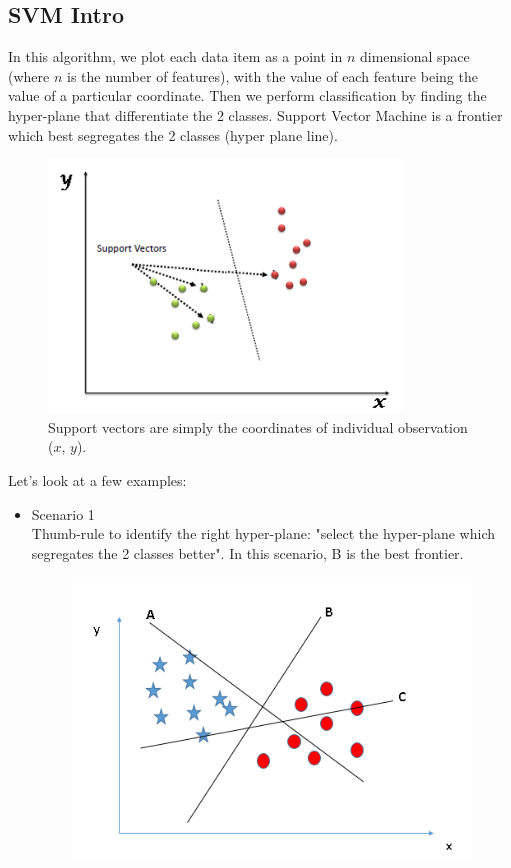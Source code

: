 \documentclass[a4paper,12pt]{report}
\begin{document}
\begin{appendices}
\section{SVM Intro}
In this algorithm, we plot each data item as a point in $n$ dimensional space (where $n$ is the number of features), with the value of each feature being the value of a particular coordinate. Then we perform classification by finding the hyper-plane that differentiate the 2 classes. Support Vector Machine is a frontier which best segregates the 2 classes (hyper plane line).
\begin{figure}[H]
	\centering
        \includegraphics[totalheight=4 cm]{SVM_1.png}\caption{Support vectors are simply the coordinates of individual observation ($x$, $y$).}
\end{figure}

Let's look at a few examples:
\begin{itemize}
\item Scenario 1 \\
Thumb-rule to identify the right hyper-plane: "select the hyper-plane which segregates the 2 classes better". In this scenario, B is the best frontier.
\begin{figure}[H]
	\centering
        \includegraphics[totalheight=4 cm]{SVM_21.png}
\end{figure}
\end{itemize}


\end{appendices}
\end{document}
